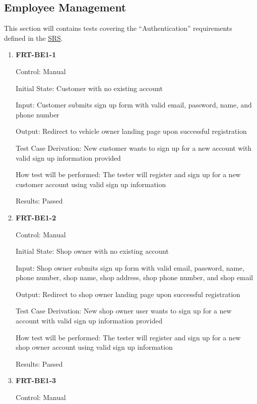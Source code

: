 \documentclass[12pt, titlepage]{article}
\begin{document}
\subsection{Employee Management}
This section will contains tests covering the ``Authentication'' requirements defined in the
\href{https://github.com/arkinmodi/project-sayyara/blob/main/docs/SRS/SRS.pdf}{SRS}.

\begin{enumerate}

	\item \textbf{FRT-BE1-1}

	      Control: Manual

	      Initial State: Customer with no existing account

	      Input: Customer submits sign up form with valid email, password, name, and phone number

	      Output: Redirect to vehicle owner landing page upon successful registration

	      Test Case Derivation: New customer wants to sign up for a new account with valid sign up
	      information provided

	      How test will be performed: The tester will register and sign up for a new customer account using
	      valid sign up information

	      Results: Passed

	\item \textbf{FRT-BE1-2}

	      Control: Manual

	      Initial State: Shop owner with no existing account

	      Input: Shop owner submits sign up form with valid email, password, name, phone number, shop name,
	      shop address, shop phone number, and shop email

	      Output: Redirect to shop owner landing page upon successful registration

	      Test Case Derivation: New shop owner user wants to sign up for a new account with valid sign up
	      information provided

	      How test will be performed: The tester will register and sign up for a new shop owner account using
	      valid sign up information

	      Results: Passed

	\item \textbf{FRT-BE1-3}

	      Control: Manual


\end{enumerate}
\end{document}
